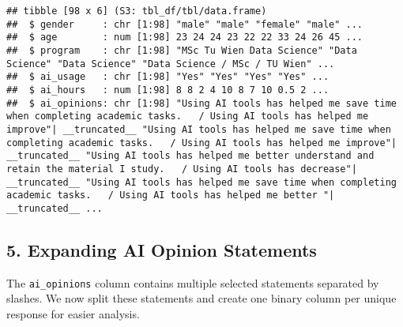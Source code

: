 \documentclass[
]{article}
\begin{document}
\begin{verbatim}
## tibble [98 x 6] (S3: tbl_df/tbl/data.frame)
##  $ gender     : chr [1:98] "male" "male" "female" "male" ...
##  $ age        : num [1:98] 23 24 24 23 22 22 33 24 26 45 ...
##  $ program    : chr [1:98] "MSc Tu Wien Data Science" "Data Science" "Data Science" "Data Science / MSc / TU Wien" ...
##  $ ai_usage   : chr [1:98] "Yes" "Yes" "Yes" "Yes" ...
##  $ ai_hours   : num [1:98] 8 8 2 4 10 8 7 10 0.5 2 ...
##  $ ai_opinions: chr [1:98] "Using AI tools has helped me save time when completing academic tasks.   / Using AI tools has helped me improve"| __truncated__ "Using AI tools has helped me save time when completing academic tasks.   / Using AI tools has helped me improve"| __truncated__ "Using AI tools has helped me better understand and retain the material I study.   / Using AI tools has decrease"| __truncated__ "Using AI tools has helped me save time when completing academic tasks.   / Using AI tools has helped me better "| __truncated__ ...
\end{verbatim}

\subsection{5. Expanding AI Opinion
Statements}\label{expanding-ai-opinion-statements}

The \texttt{ai\_opinions} column contains multiple selected statements
separated by slashes. We now split these statements and create one
binary column per unique response for easier analysis.
\end{document}
